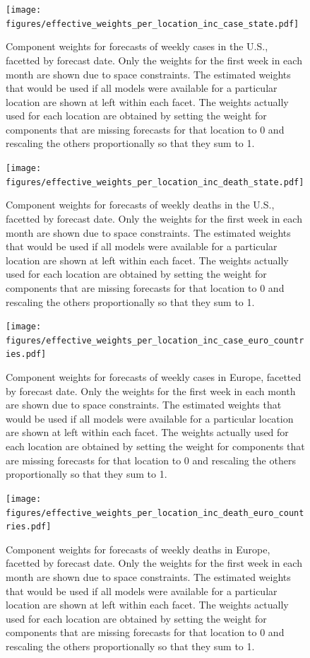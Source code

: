\documentclass{article}
\begin{document}
\begin{figure}
  \texttt{[image: figures/effective\_weights\_per\_location\_inc\_case\_state.pdf]}
  \caption{Component weights for forecasts of weekly cases in the U.S., facetted by forecast date. Only the weights for the first week in each month are shown due to space constraints. The estimated weights that would be used if all models were available for a particular location are shown at left within each facet. The weights actually used for each location are obtained by setting the weight for components that are missing forecasts for that location to 0 and rescaling the others proportionally so that they sum to 1.}
  \label{fig:case_us_effective_weights}
\end{figure}

\begin{figure}
  \texttt{[image: figures/effective\_weights\_per\_location\_inc\_death\_state.pdf]}
  \caption{Component weights for forecasts of weekly deaths in the U.S., facetted by forecast date. Only the weights for the first week in each month are shown due to space constraints. The estimated weights that would be used if all models were available for a particular location are shown at left within each facet. The weights actually used for each location are obtained by setting the weight for components that are missing forecasts for that location to 0 and rescaling the others proportionally so that they sum to 1.}
  \label{fig:death_us_effective_weights}
\end{figure}

\begin{figure}
  \texttt{[image: figures/effective\_weights\_per\_location\_inc\_case\_euro\_countries.pdf]}
  \caption{Component weights for forecasts of weekly cases in Europe, facetted by forecast date. Only the weights for the first week in each month are shown due to space constraints. The estimated weights that would be used if all models were available for a particular location are shown at left within each facet. The weights actually used for each location are obtained by setting the weight for components that are missing forecasts for that location to 0 and rescaling the others proportionally so that they sum to 1.}
  \label{fig:case_eu_effective_weights}
\end{figure}

\begin{figure}
  \texttt{[image: figures/effective\_weights\_per\_location\_inc\_death\_euro\_countries.pdf]}
  \caption{Component weights for forecasts of weekly deaths in Europe, facetted by forecast date. Only the weights for the first week in each month are shown due to space constraints. The estimated weights that would be used if all models were available for a particular location are shown at left within each facet. The weights actually used for each location are obtained by setting the weight for components that are missing forecasts for that location to 0 and rescaling the others proportionally so that they sum to 1.}
  \label{fig:death_eu_effective_weights}
\end{figure}
\end{document}
